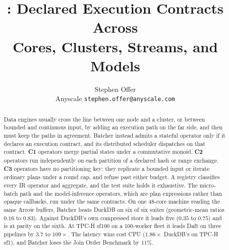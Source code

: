 \documentclass[10pt,twocolumn,letterpaper]{article}   %
\title{\sys{}: Declared Execution Contracts Across\\Cores, Clusters, Streams, and Models}
\author{Stephen Offer\\ \small Anyscale \quad\textbullet\quad \texttt{stephen.offer@anyscale.com}}
\date{}
\newcommand{\sys}{Batcher}
\newcommand{\Ca}{\textsc{C1}}
\newcommand{\Cb}{\textsc{C2}}
\newcommand{\Cc}{\textsc{C3}}
\begin{document}
\maketitle

\begin{abstract}
\noindent
Data engines usually cross the line between one node and a cluster, or between bounded and
continuous input, by adding an execution path on the far side, and then must keep the paths in
agreement. \sys{} instead admits a stateful operator only if it declares an execution contract,
and its distributed scheduler dispatches on that contract. \textbf{\Ca{}} operators merge
partial states under a commutative monoid. \textbf{\Cb{}} operators run independently on each
partition of a declared hash or range exchange. \textbf{\Cc{}} operators have no partitioning
key: they replicate a bounded input or iterate ordinary plans under a round cap, and refuse
past either budget. A registry classifies every IR operator and aggregate, and the test suite
holds it exhaustive. The micro-batch path and the model-inference operators, which are plan
expressions rather than opaque callbacks, run under the same contracts.
On one 48-core machine reading the same Arrow buffers, \sys{} beats DuckDB on six of six suites
(geometric-mean ratios $0.16$ to $0.83$). Against DuckDB's own compressed store it leads five
($0.35$ to $0.75$) and is at parity on the sixth. At TPC-H sf100 on a 100-worker fleet it leads
Daft on three pipelines by $3.7$ to $109\times$. The latency wins cost CPU ($1.86\times$
DuckDB's on TPC-H sf1), and \sys{} loses the Join Order Benchmark by 11\%.
\end{abstract}
\end{document}
